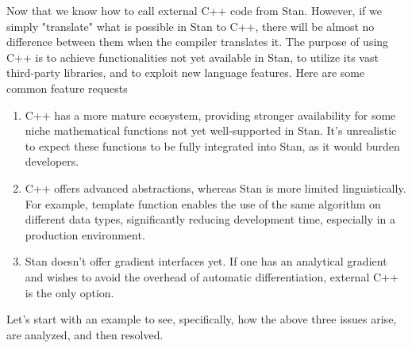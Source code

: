 \documentclass[11pt]{article}
\begin{document}
Now that we know how to call external C++ code from Stan. However, if we simply "translate" what is possible in Stan to C++, there will be almost no difference between them when the compiler translates it. The purpose of using C++ is to achieve functionalities not yet available in Stan, to utilize its vast third-party libraries, and to exploit new language features. Here are some common feature requests
\begin{enumerate}
	\item C++ has a more mature ecosystem, providing stronger availability for some niche mathematical functions not yet well-supported in Stan. It's unrealistic to expect these functions to be fully integrated into Stan, as it would burden developers.
	\item C++ offers advanced abstractions, whereas Stan is more limited linguistically. For example, template function enables the use of the same algorithm on different data types, significantly reducing development time, especially in a production environment.
	\item Stan doesn't offer gradient interfaces yet. If one has an analytical gradient and wishes to avoid the overhead of automatic differentiation, external C++ is the only option.
\end{enumerate}

Let's start with an example to see, specifically, how the above three issues arise, are analyzed, and then resolved.

\begin{comment}
通常情况下，在项目中我们会有很多不同的模型文件共同依赖同一个（或一些）C++头文件。为了应对第一点，在每次编译时，都需要手动更改C++代码的命名空间，这是繁琐且容易出错的。如下代码可以帮助解决这一问题。

现在我们知道了如何从stan中调用外部c++代码了，请编译运行试试吧。然而，如果只是单纯地将stan代码转换为C++，在编译器转译后两者几乎是没有区别的。我们使用c++的目的是为了达成那些stan中还未提供的功能、海量的第三方库和新的语言特性。例如，由于c++生态较为完善，一些比较偏门数学的函数在c++中有较强的可用性，而stan还没有成熟的接口。要求这些函数全部暴露在stan中是不现实的，也会给开发者造成负担。又比如，C++提供非常高级的抽象，而stan在语言方面还比较受限。模版函数能够把用同一个算法去适用于不同类型数据，从而大大减少开发时间。最后，stan中还不提供梯度接口，如果有梯度的解析式，想避免自动微分的开销的话，只能寻求外部c++。

让我们从一个例子出发来看看，具体地来说，上面的3点问题是如何产生，分析，并得到解决的。

\end{comment}
\end{document}
